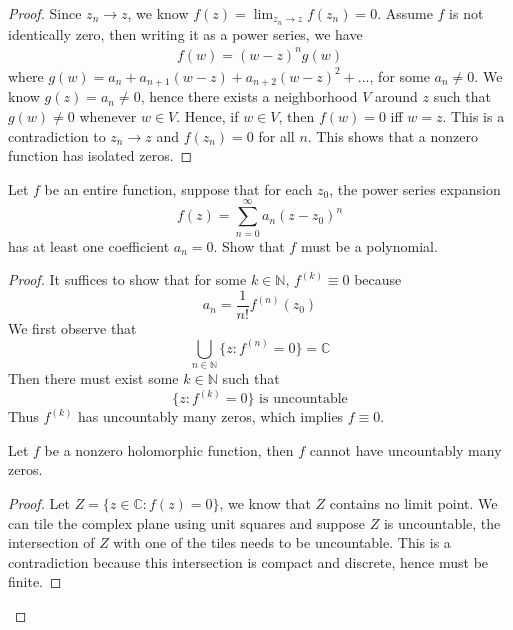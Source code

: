 \documentclass[openany]{book}
\newcommand{\C}{\mathbb{C}}
\begin{document}
\begin{proof}
    Since $z_n\to z$, we know $f(z)=\lim_{z_n\to z}f(z_n)=0$. Assume $f$ is not identically zero, then writing it as a power series, we have 
    \begin{align*}
        f(w)=(w-z)^ng(w)
    \end{align*}
    where $g(w)=a_n+a_{n+1}(w-z)+a_{n+2}(w-z)^2+\dots$, for some $a_n\neq 0$. We know $g(z)=a_n\neq 0$, hence there exists a neighborhood $V$ around $z$ such that $g(w)\neq 0$ whenever $w\in V$. Hence, if $w\in V$, then $f(w)=0$ iff $w=z$. This is a contradiction to $z_n\to z$ and $f(z_n)=0$ for all $n$. This shows that a nonzero function has isolated zeros.
\end{proof}


\begin{prob}[Spring 2018, Q4]
    Let $f$ be an entire function, suppose that for each $z_0$, the power series expansion 
    \begin{equation*}
        f(z)=\sum_{n=0}^\infty a_n(z-z_0)^n
    \end{equation*}
    has at least one coefficient $a_n=0$. Show that $f$ must be a polynomial.
\end{prob}

\begin{proof}
    It suffices to show that for some $k\in\mathbb{N}$, $f^{(k)}\equiv 0$ because
    \begin{equation*}
        a_n=\frac{1}{n!}f^{(n)}(z_0)
    \end{equation*}
    We first observe that 
    \begin{equation*}
        \bigcup_{n\in\mathbb{N}}\{z: f^{(n)}=0\}=\C
    \end{equation*}
    Then there must exist some $k\in\mathbb{N}$ such that 
    \begin{equation*}
        \{z: f^{(k)}=0\} \text{ is uncountable}
    \end{equation*}
    Thus $f^{(k)}$ has uncountably many zeros, which implies $f\equiv 0$. 
    \begin{lem}
        Let $f$ be a nonzero holomorphic function, then $f$ cannot have uncountably many zeros.
    \end{lem}
    \begin{proof}
        Let $Z=\{z\in\C: f(z)=0\}$, we know that $Z$ contains no limit point. We can tile the complex plane using unit squares and suppose $Z$ is uncountable, the intersection of $Z$ with one of the tiles needs to be uncountable. This is a contradiction because this intersection is compact and discrete, hence must be finite.
    \end{proof}
\end{proof}
\end{document}
